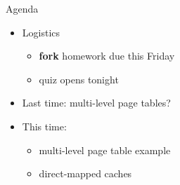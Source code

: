 \begin{frame}{Agenda}
    \begin{itemize}
        \item Logistics
            \begin{itemize}
            \item \textbf{fork} homework due this Friday
            \item quiz opens tonight
            \end{itemize}

        \item Last time: multi-level page tables?

        \item This time:
            \begin{itemize}
                \item multi-level page table example
                \item direct-mapped caches
            \end{itemize}

    \end{itemize}
\end{frame}